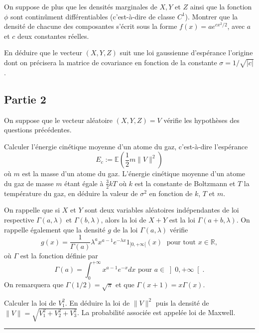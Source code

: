 \label{II-Maxwell-2}
On suppose de plus que les densités marginales de \(X, Y\) et \(Z\)
ainsi que la fonction \(\phi\) sont continûment différentiables
(c'est-à-dire de classe \(C^1\)). Montrer que la densité de chacune des
composantes s'écrit sous la forme \(f (x) = a e^{cx^2/2}\), avec \(a\)
et \(c\) deux constantes réelles.

\label{II-Maxwell-3}
En déduire que le vecteur \((X, Y, Z)\) suit une loi gaussienne
d'espérance l'origine dont on précisera la matrice de covariance en
fonction de la constante
\(\sigma = 1/\sqrt{|c|}\).

\subsection*{Partie 2}\label{II-partie-2}

On suppose que le vecteur aléatoire \((X, Y, Z) = V\) vérifie les
hypothèses des questions précédentes.

\label{II-Maxwell-4}
Calculer l'énergie cinétique moyenne d'un atome du gaz, c'est-à-dire
l'espérance \[
E_c := \mathbb{E}\left(\frac{1}{2}m\|V\|^2\right)
\] où \(m\) est la masse d'un atome du gaz. L'énergie cinétique moyenne
d'un atome du gaz de masse \(m\) étant égale à \(\frac{3}{2} kT\) où
\(k\) est la constante de Boltzmann et \(T\) la température du gaz, en
déduire la valeur de \(\sigma^2\) en fonction de \(k\), \(T\) et
\(m\).

\label{II-Maxwell-5}
On rappelle que si \(X\) et \(Y\) sont deux variables aléatoires
indépendantes de loi respective \(\Gamma (a,\lambda)\) et
\(\Gamma (b,\lambda)\), alors la loi de \(X + Y\) est la loi
\(\Gamma (a+b,\lambda)\). On rappelle également que la densité \(g\) de
la loi \(\Gamma (a,\lambda)\) vérifie \[
g(x) = \frac{1}{\Gamma(a)}\lambda^a x^{a -1} e^{-\lambda x} 1_{]0,+\infty[}(x)
\; \mbox{ pour tout $x\in\mathbb{R}$},
\] où \(\Gamma\) est la fonction définie par
\[\Gamma(a) = \int_0^{+\infty} x^{a-1}e^{-x} dx \text{ pour } a \in \left] 0, + \infty \right[.\]
On remarquera que \(\Gamma(1/2) = \sqrt{\pi}\) et que
\(\Gamma(x+1) = x \Gamma(x).\)

Calculer la loi de \(V_1^2\). En déduire la loi de \(\|V \|^2\) puis la
densité de \(\|V \| = \sqrt{V_1^2 + V_2^2 + V_3^2}\). La probabilité
associée est appelée loi de Maxwell. 

\begin{center}\rule{0.5\linewidth}{0.5pt}\end{center}

